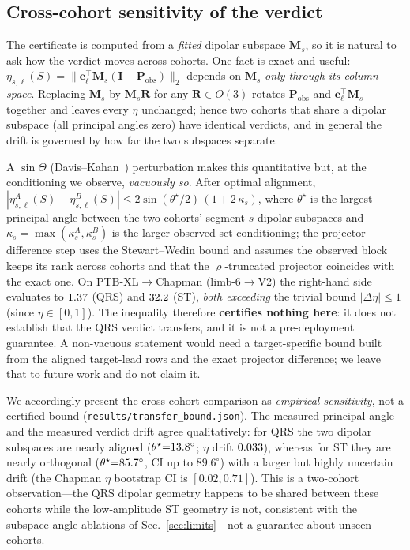 \subsection*{Cross-cohort sensitivity of the verdict}
\label{sec:transfer}
The certificate is computed from a \emph{fitted} dipolar subspace $\bm M_s$, so it is natural to ask
how the verdict moves across cohorts. One fact is exact and useful:
$\eta_{s,\ell}(S)=\|\bm e_\ell^\top\bm M_s(\bm I-\bm P_{\mathrm{obs}})\|_2$ depends on $\bm M_s$
\emph{only through its column space}. Replacing $\bm M_s$ by $\bm M_s\bm R$ for any $\bm R\in O(3)$
rotates $\bm P_{\mathrm{obs}}$ and $\bm e_\ell^\top\bm M_s$ together and leaves every $\eta$ unchanged;
hence two cohorts that share a dipolar subspace (all principal angles zero) have identical verdicts,
and in general the drift is governed by how far the two subspaces separate.

A $\sin\Theta$ (Davis--Kahan~\cite{davis1970rotation}) perturbation makes this quantitative but, at
the conditioning we observe, \emph{vacuously so}. After optimal alignment,
$|\eta^A_{s,\ell}(S)-\eta^B_{s,\ell}(S)|\le 2\sin(\theta^\star/2)\,(1+2\,\kappa_s)$, where
$\theta^\star$ is the largest principal angle between the two cohorts' segment-$s$ dipolar subspaces
and $\kappa_s=\max(\kappa_s^A,\kappa_s^B)$ is the larger observed-set conditioning; the
projector-difference step uses the Stewart--Wedin bound and assumes the observed block keeps its rank
across cohorts and that the $\varrho$-truncated projector coincides with the exact one. On
PTB-XL$\to$Chapman (limb-6$\to$V2) the right-hand side evaluates to $1.37$ (QRS) and
$32.2$ (ST), \emph{both exceeding} the trivial bound $|\Delta\eta|\le1$ (since
$\eta\in[0,1]$). The inequality therefore \textbf{certifies nothing here}: it does not establish that
the QRS verdict transfers, and it is not a pre-deployment guarantee. A non-vacuous statement would
need a target-specific bound built from the aligned target-lead rows and the exact projector
difference; we leave that to future work and do not claim it.

We accordingly present the cross-cohort comparison as \emph{empirical sensitivity}, not a certified
bound (\texttt{results/transfer\_bound.json}). The measured principal angle and the measured verdict
drift agree qualitatively: for QRS the two dipolar subspaces are nearly aligned
($\theta^\star{=}13.8^\circ$; $\eta$ drift $0.033$), whereas for ST they are
nearly orthogonal ($\theta^\star{=}85.7^\circ$, CI up to $89.6^\circ$) with a larger but
highly uncertain drift (the Chapman $\eta$ bootstrap CI is $[0.02,0.71]$). This is a two-cohort
observation---the QRS dipolar geometry happens to be shared between these cohorts while the
low-amplitude ST geometry is not, consistent with the subspace-angle ablations of
Sec.~\ref{sec:limits}---not a guarantee about unseen cohorts.

